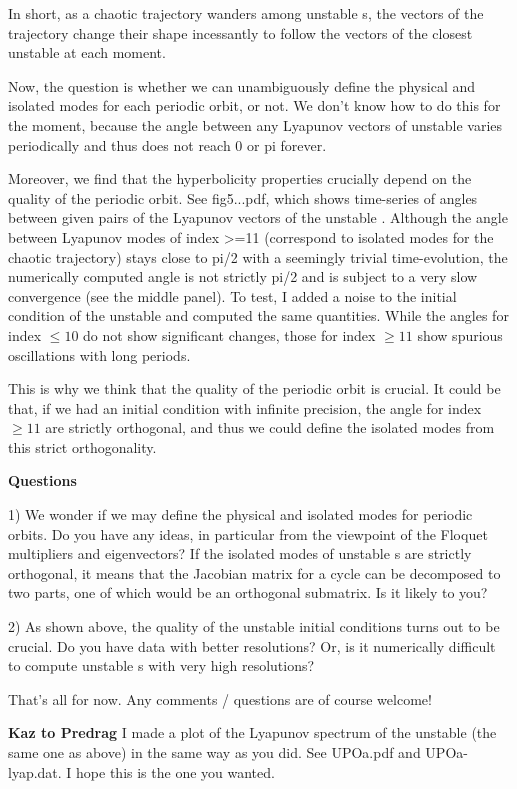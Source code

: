 \begin{description}
In short, as a chaotic trajectory wanders among {unstable \po}s, the vectors of the
trajectory change their shape incessantly to follow the vectors of the
closest {unstable \po} at each moment.


Now, the question is whether we can unambiguously define the physical
and isolated modes for each periodic orbit, or not. We don't know how to
do this for the moment, because the angle between any Lyapunov vectors
of {unstable \po} varies periodically and thus does not reach 0 or pi forever.

Moreover, we find that the hyperbolicity properties crucially depend on
the quality of the periodic orbit. See fig5...pdf, which shows
time-series of angles between given pairs of the Lyapunov vectors of the
{unstable \po}. Although the angle between Lyapunov modes of index >=11 (correspond
to isolated modes for the chaotic trajectory) stays close to pi/2 with a
seemingly trivial time-evolution, the numerically computed angle is not
strictly pi/2 and is subject to a very slow convergence (see the middle
panel). To test, I added a noise to the initial condition of the {unstable \po} and
computed the same quantities. While the angles for index $\leq 10$ do not
show significant changes, those for index $\geq 11$ show spurious
oscillations with long periods.

This is why we think that the quality of the periodic orbit is crucial.
It could be that, if we had an initial condition with infinite
precision, the angle for index $\geq 11$ are strictly orthogonal, and thus we
could define the isolated modes from this strict orthogonality.


\textbf{Questions}

1) We wonder if we may define the physical and isolated modes for
periodic orbits. Do you have any ideas, in particular from the viewpoint
of the Floquet multipliers and eigenvectors? If the isolated modes of
{unstable \po}s are strictly orthogonal, it means that the Jacobian matrix for a
cycle can be decomposed to two parts, one of which would be an
orthogonal submatrix. Is it likely to you?

2) As shown above, the quality of the {unstable \po} initial conditions turns out
to be crucial. Do you have data with better resolutions? Or, is it
numerically difficult to compute {unstable \po}s with very high resolutions?

That's all for now. Any comments / questions are of course welcome!


\textbf{Kaz to Predrag} I made a plot of the Lyapunov spectrum of
the {unstable \po} (the same one as above) in the same way as you did. See UPOa.pdf
and UPOa-lyap.dat. I hope this is the one you wanted.


\end{description}
